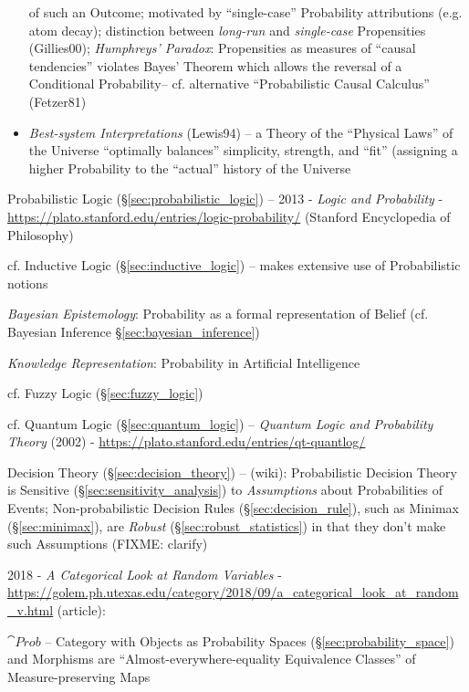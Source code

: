 \begin{itemize}
    of such an Outcome; motivated by ``single-case'' Probability attributions
    (e.g. atom decay); distinction between \emph{long-run} and
    \emph{single-case} Propensities (Gillies00); \emph{Humphreys' Paradox}:
    Propensities as measures of ``causal tendencies'' violates Bayes' Theorem
    which allows the reversal of a Conditional Probability-- cf. alternative
    ``Probabilistic Causal Calculus'' (Fetzer81)
  \item \emph{Best-system Interpretations} (Lewis94) -- a Theory of the
    ``Physical Laws'' of the Universe ``optimally balances'' simplicity,
    strength, and ``fit'' (assigning a higher Probability to the ``actual''
    history of the Universe
\end{itemize}

\fist Probabilistic Logic (\S\ref{sec:probabilistic_logic}) --
2013 - \emph{Logic and Probability} -
\url{https://plato.stanford.edu/entries/logic-probability/} (Stanford
Encyclopedia of Philosophy)

\fist cf. Inductive Logic (\S\ref{sec:inductive_logic}) -- makes extensive use
of Probabilistic notions

\emph{Bayesian Epistemology}: Probability as a formal representation of Belief
(cf. Bayesian Inference \S\ref{sec:bayesian_inference})

\emph{Knowledge Representation}: Probability in Artificial Intelligence

\fist cf. Fuzzy Logic (\S\ref{sec:fuzzy_logic})

\fist cf. Quantum Logic (\S\ref{sec:quantum_logic}) --
\emph{Quantum Logic and Probability Theory} (2002) -
\url{https://plato.stanford.edu/entries/qt-quantlog/}

\fist Decision Theory (\S\ref{sec:decision_theory}) --
(wiki): Probabilistic Decision Theory is Sensitive
(\S\ref{sec:sensitivity_analysis}) to \emph{Assumptions} about Probabilities of
Events; Non-probabilistic Decision Rules (\S\ref{sec:decision_rule}), such as
Minimax (\S\ref{sec:minimax}), are \emph{Robust} (\S\ref{sec:robust_statistics})
in that they don't make such Assumptions (FIXME: clarify)

2018 - \emph{A Categorical Look at Random Variables} -
\url{https://golem.ph.utexas.edu/category/2018/09/a_categorical_look_at_random_v.html} (article):

$\cat{Prob}$ -- Category with Objects as Probability Spaces
(\S\ref{sec:probability_space}) and Morphisms are ``Almost-everywhere-equality
Equivalence Classes'' of Measure-preserving Maps

